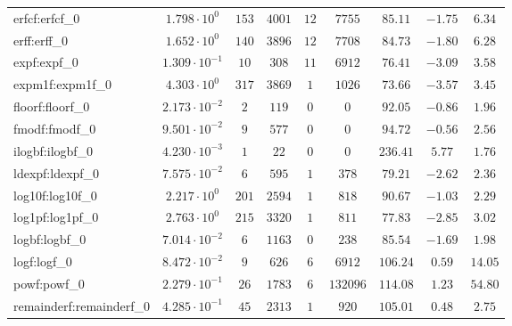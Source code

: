 \begin{tabular}{|l|c|c|c|c|c|c|c|c|}
erfcf:erfcf\_0               & $ 1.798 \cdot 10^{0}  $ & $ 153    $ & $ 4001  $ & $ 12  $ & $ 7755   $ & $ 85.11       $ & $ -1.75   $ & $ 6.34    $ \\
erff:erff\_0                 & $ 1.652 \cdot 10^{0}  $ & $ 140    $ & $ 3896  $ & $ 12  $ & $ 7708   $ & $ 84.73       $ & $ -1.80   $ & $ 6.28    $ \\
expf:expf\_0                 & $ 1.309 \cdot 10^{-1} $ & $ 10     $ & $ 308   $ & $ 11  $ & $ 6912   $ & $ 76.41       $ & $ -3.09   $ & $ 3.58    $ \\
expm1f:expm1f\_0             & $ 4.303 \cdot 10^{0}  $ & $ 317    $ & $ 3869  $ & $ 1   $ & $ 1026   $ & $ 73.66       $ & $ -3.57   $ & $ 3.45    $ \\
floorf:floorf\_0             & $ 2.173 \cdot 10^{-2} $ & $ 2      $ & $ 119   $ & $ 0   $ & $ 0      $ & $ 92.05       $ & $ -0.86   $ & $ 1.96    $ \\
fmodf:fmodf\_0               & $ 9.501 \cdot 10^{-2} $ & $ 9      $ & $ 577   $ & $ 0   $ & $ 0      $ & $ 94.72       $ & $ -0.56   $ & $ 2.56    $ \\
ilogbf:ilogbf\_0             & $ 4.230 \cdot 10^{-3} $ & $ 1      $ & $ 22    $ & $ 0   $ & $ 0      $ & $ 236.41      $ & $ 5.77    $ & $ 1.76    $ \\
ldexpf:ldexpf\_0             & $ 7.575 \cdot 10^{-2} $ & $ 6      $ & $ 595   $ & $ 1   $ & $ 378    $ & $ 79.21       $ & $ -2.62   $ & $ 2.36    $ \\
log10f:log10f\_0             & $ 2.217 \cdot 10^{0}  $ & $ 201    $ & $ 2594  $ & $ 1   $ & $ 818    $ & $ 90.67       $ & $ -1.03   $ & $ 2.29    $ \\
log1pf:log1pf\_0             & $ 2.763 \cdot 10^{0}  $ & $ 215    $ & $ 3320  $ & $ 1   $ & $ 811    $ & $ 77.83       $ & $ -2.85   $ & $ 3.02    $ \\
logbf:logbf\_0               & $ 7.014 \cdot 10^{-2} $ & $ 6      $ & $ 1163  $ & $ 0   $ & $ 238    $ & $ 85.54       $ & $ -1.69   $ & $ 1.98    $ \\
logf:logf\_0                 & $ 8.472 \cdot 10^{-2} $ & $ 9      $ & $ 626   $ & $ 6   $ & $ 6912   $ & $ 106.24      $ & $ 0.59    $ & $ 14.05   $ \\
powf:powf\_0                 & $ 2.279 \cdot 10^{-1} $ & $ 26     $ & $ 1783  $ & $ 6   $ & $ 132096 $ & $ 114.08      $ & $ 1.23    $ & $ 54.80   $ \\
remainderf:remainderf\_0     & $ 4.285 \cdot 10^{-1} $ & $ 45     $ & $ 2313  $ & $ 1   $ & $ 920    $ & $ 105.01      $ & $ 0.48    $ & $ 2.75    $ \\

\end{tabular}

